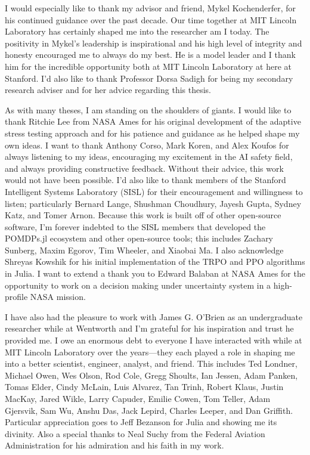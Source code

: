 I would especially like to thank my advisor and friend, Mykel Kochenderfer, for his continued guidance over the past decade.
Our time together at MIT Lincoln Laboratory has certainly shaped me into the researcher am I today.
The positivity in Mykel's leadership is inspirational and his high level of integrity and honesty encouraged me to always do my best.
He is a model leader and I thank him for the incredible opportunity both at MIT Lincoln Laboratory at here at Stanford.
I'd also like to thank Professor Dorsa Sadigh for being my secondary research adviser and for her advice regarding this thesis.

As with many theses, I am standing on the shoulders of giants.
I would like to thank Ritchie Lee from NASA Ames for his original development of the adaptive stress testing approach and for his patience and guidance as he helped shape my own ideas.
I want to thank Anthony Corso, Mark Koren, and Alex Koufos for always listening to my ideas, encouraging my excitement in the AI safety field, and always providing constructive feedback. Without their advice, this work would not have been possible.
I'd also like to thank members of the Stanford Intelligent Systems Laboratory (SISL) for their encouragement and willingness to listen; particularly Bernard Lange, Shushman Choudhury, Jayesh Gupta, Sydney Katz, and Tomer Arnon.
Because this work is built off of other open-source software, I'm forever indebted to the SISL members that developed the POMDPs.jl ecosystem and other open-source tools; this includes Zachary Sunberg, Maxim Egorov, Tim Wheeler, and Xiaobai Ma.
I also acknowledge Shreyas Kowshik for his initial implementation of the TRPO and PPO algorithms in Julia.
I want to extend a thank you to Edward Balaban at NASA Ames for the opportunity to work on a decision making under uncertainty system in a high-profile NASA mission.

I have also had the pleasure to work with James G. O'Brien as an undergraduate researcher while at Wentworth and I'm grateful for his inspiration and trust he provided me. I owe an enormous debt to everyone I have interacted with while at MIT Lincoln Laboratory over the years---they each played a role in shaping me into a better scientist, engineer, analyst, and friend. This includes Ted Londner, Michael Owen, Wes Olson, Rod Cole, Gregg Shoults, Ian Jessen, Adam Panken, Tomas Elder, Cindy McLain, Luis Alvarez, Tan Trinh, Robert Klaus, Justin MacKay, Jared Wikle, Larry Capuder, Emilie Cowen, Tom Teller, Adam Gjersvik, Sam Wu, Anshu Das, Jack Lepird, Charles Leeper, and Dan Griffith. Particular appreciation goes to Jeff Bezanson for Julia and showing me its divinity. Also a special thanks to Neal Suchy from the Federal Aviation Administration for his admiration and his faith in my work.

